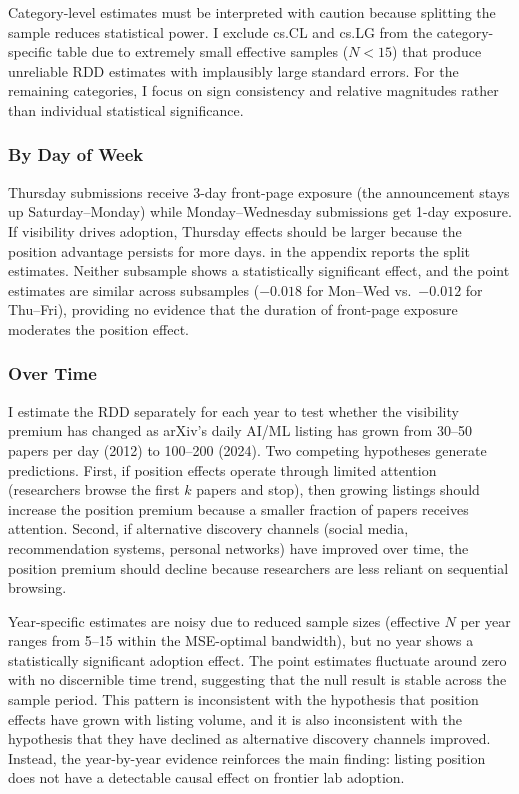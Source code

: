 \documentclass[12pt]{article}
\begin{document}
  


Category-level estimates must be interpreted with caution because splitting the sample reduces statistical power. I exclude cs.CL and cs.LG from the category-specific table due to extremely small effective samples ($N < 15$) that produce unreliable RDD estimates with implausibly large standard errors. For the remaining categories, I focus on sign consistency and relative magnitudes rather than individual statistical significance.

\subsubsection{By Day of Week}

Thursday submissions receive 3-day front-page exposure (the announcement stays up Saturday--Monday) while Monday--Wednesday submissions get 1-day exposure. If visibility drives adoption, Thursday effects should be larger because the position advantage persists for more days.  in the appendix reports the split estimates. Neither subsample shows a statistically significant effect, and the point estimates are similar across subsamples ($-0.018$ for Mon--Wed vs.\ $-0.012$ for Thu--Fri), providing no evidence that the duration of front-page exposure moderates the position effect.

\subsubsection{Over Time}

I estimate the RDD separately for each year to test whether the visibility premium has changed as arXiv's daily AI/ML listing has grown from 30--50 papers per day (2012) to 100--200 (2024). Two competing hypotheses generate predictions. First, if position effects operate through limited attention (researchers browse the first $k$ papers and stop), then growing listings should increase the position premium because a smaller fraction of papers receives attention. Second, if alternative discovery channels (social media, recommendation systems, personal networks) have improved over time, the position premium should decline because researchers are less reliant on sequential browsing.

Year-specific estimates are noisy due to reduced sample sizes (effective $N$ per year ranges from 5--15 within the MSE-optimal bandwidth), but no year shows a statistically significant adoption effect. The point estimates fluctuate around zero with no discernible time trend, suggesting that the null result is stable across the sample period. This pattern is inconsistent with the hypothesis that position effects have grown with listing volume, and it is also inconsistent with the hypothesis that they have declined as alternative discovery channels improved. Instead, the year-by-year evidence reinforces the main finding: listing position does not have a detectable causal effect on frontier lab adoption.
\end{document}

